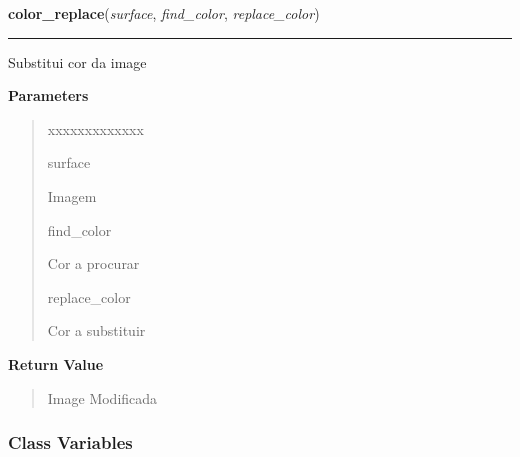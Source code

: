 \hspace{.8\funcindent}\begin{boxedminipage}{\funcwidth}

    \raggedright \textbf{color\_replace}(\textit{surface}, \textit{find\_color}, \textit{replace\_color})

    \vspace{-1.5ex}

    \rule{\textwidth}{0.5\fboxrule}
\setlength{\parskip}{2ex}
    Substitui cor da image

\setlength{\parskip}{1ex}
      \textbf{Parameters}
      \vspace{-1ex}

      \begin{quote}
        \begin{Ventry}{xxxxxxxxxxxxx}

          \item[surface]

          Imagem

          \item[find\_color]

          Cor a procurar

          \item[replace\_color]

          Cor a substituir

        \end{Ventry}

      \end{quote}

      \textbf{Return Value}
    \vspace{-1ex}

      \begin{quote}
      Image Modificada

      \end{quote}

    \end{boxedminipage}



  \subsubsection{Class Variables}

